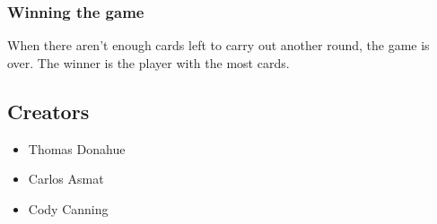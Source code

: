 \documentclass[11pt]{article}
\begin{document}
\subsubsection{Winning the game}
\label{sec-1-2-3}

When there aren't enough cards left to carry out another round, the
game is over. The winner is the player with the most cards.
\subsection{Creators}
\label{sec-1-3}

\begin{itemize}
\item Thomas Donahue
\item Carlos Asmat
\item Cody Canning
\end{itemize}
\end{document}
